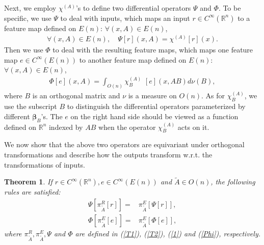 \documentclass{article}
\newtheorem{theorem}{Theorem}
\begin{document}
Next, we employ $\chi^{(A)}$'s to define two differential operators $\Psi$ and $\Phi$. To be specific, we use $\Psi$ to deal with inputs, which maps an input $r\in C^\infty(\mathbb{R}^n)$ to a feature map defined on $E(n)$: $\forall (x,A)\in E(n)$,
\begin{align}
\forall (x,A)\in E(n),\quad \Psi [r](x,A)=\chi^{(A)}[r](x).
\label{1}
\end{align}
Then we use $\Phi$ to deal with the resulting feature maps, which maps one feature map $e\in C^\infty(E(n))$ to another feature map defined on $E(n)$: \\
$\forall (x,A)\in E(n)$,
\begin{align}
\Phi [e](x,A)=\int_{O(n)} \chi^{(A)}_{B}\,\,[e](x,AB) d\nu(B)\label{Phi},
\end{align}
where $B$ is an orthogonal matrix and $\nu$ is a measure on $O(n)$. As for $\chi_B^{(A)}$, we use the subscript $B$ to distinguish the differential operators parameterized by different $\bm{\beta}_B$'s. The $e$ on the right hand side should be viewed as a function defined on $\mathbb{R}^n$ indexed by $AB$ when the operator $\chi^{(A)}_B$ acts on it.

We now show that the above two operators are equivariant under orthogonal transformations and describe how the outputs transform w.r.t. the transformations of inputs.

\begin{theorem}
	If $r \in C^{\infty}(\mathbb{R}^n), e \in C^{\infty}(E(n))$ and $\widetilde{A}\in O(n)$, the following rules are satisfied:
	\begin{align}
	\Psi \left[\pi^{R}_{\widetilde A}[r]\right]=&\pi^{E}_{\widetilde A}\left[\Psi [r]\right],\label{e1}\\
	\Phi \left[\pi^{E}_{\widetilde A}[e]\right] =& \pi^{E}_{\widetilde A}\left[\Phi [e]\right],\label{e2}
	\end{align}
	where $\pi^{R}_{\widetilde A},\pi^{E}_{\widetilde A},\Psi$ and $\Phi$ are defined in (\ref{T1}), (\ref{T2}), (\ref{1}) and (\ref{Phi}), respectively.
	\label{theorem1}
\end{theorem}
\end{document}
